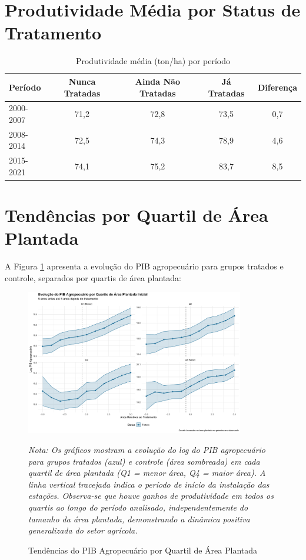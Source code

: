 \documentclass[
	12pt,				%
	oneside,			%
	a4paper,			%
	english,			%
	french,				%
	spanish,			%
	brazil				%
	]{abntex2}
\begin{document}
\begin{apendicesenv}
\section{Produtividade Média por Status de Tratamento}

\begin{table}[h]
\centering
\caption{Produtividade média (ton/ha) por período}
\label{tab:produtividade_status}
\begin{tabular}{lcccc}
\toprule
Período & Nunca Tratadas & Ainda Não Tratadas & Já Tratadas & Diferença \\
\midrule
2000-2007 & 71,2 & 72,8 & 73,5 & 0,7 \\
2008-2014 & 72,5 & 74,3 & 78,9 & 4,6 \\
2015-2021 & 74,1 & 75,2 & 83,7 & 8,5 \\
\bottomrule
\end{tabular}
\end{table}

\section{Tendências por Quartil de Área Plantada}

A Figura \ref{fig:trends_quartile} apresenta a evolução do PIB agropecuário para grupos tratados e controle, separados por quartis de área plantada:

\begin{figure}[h]
\centering
\caption{Tendências do PIB Agropecuário por Quartil de Área Plantada}
\label{fig:trends_quartile}
\includegraphics[width=0.85\textwidth]{../../../data/outputs/additional_figures/trends_by_size_quartile.png}

\textit{Nota: Os gráficos mostram a evolução do log do PIB agropecuário para grupos tratados (azul) e controle (área sombreada) em cada quartil de área plantada (Q1 = menor área, Q4 = maior área). A linha vertical tracejada indica o período de início da instalação das estações. Observa-se que houve ganhos de produtividade em todos os quartis ao longo do período analisado, independentemente do tamanho da área plantada, demonstrando a dinâmica positiva generalizada do setor agrícola.}
\end{figure}


\end{apendicesenv}
\end{document}

